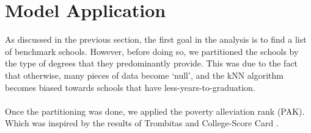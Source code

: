 \documentclass[12pt]{scrartcl}
\begin{document}
\section{Model Application} 
	As discussed in the previous section, the first goal in the analysis is to find a list of benchmark schools. However, before doing so, we partitioned the schools by the type of degrees that they predominantly provide. This was due to the fact that otherwise, many pieces of data become `null', and the kNN algorithm becomes biased towards schools that have less-years-to-graduation.\\ 
	\\
	Once the partitioning was done, we applied the poverty alleviation rank (PAK). Which was inspired by the results of Trombitas \cite{Trom} and College-Score Card \cite{US}.\\
	\begin{figure}[H]
	\centering
	\centering
	\end{figure}
	
\end{document}
